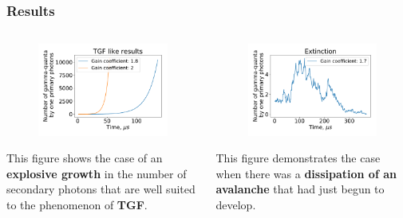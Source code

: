 \documentclass[8pt,pdf,hyperref={unicode}]{beamer}
\begin{document}
\begin{frame}
    \frametitle{Results}
\begin{columns}
	\begin{column}{0.5\textwidth}
		\begin{figure}[htb]
		\centering
		\includegraphics[width=1\columnwidth]{proofTGF.pdf}
		\end{figure}
		This figure shows the case of an \textbf{explosive growth} in the number of secondary photons that are well suited to the phenomenon of \textbf{TGF}.
	\end{column}
	\begin{column}{0.5\textwidth}
		\begin{figure}[htb]
			\centering
			\includegraphics[width=1\columnwidth]{Extinction.pdf}
		\end{figure}
		This figure demonstrates the case when there was a \textbf{dissipation of an avalanche} that had just begun to develop.

	\end{column}
\end{columns}
    
\end{frame}
\end{document}
